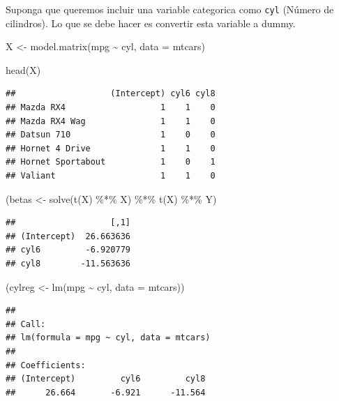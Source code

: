 \documentclass[
  12pt,
]{book}
\newenvironment{Shaded}{\begin{snugshade}}{\end{snugshade}}
\newcommand{\AttributeTok}[1]{\textcolor[rgb]{0.77,0.63,0.00}{#1}}
\newcommand{\FunctionTok}[1]{\textcolor[rgb]{0.00,0.00,0.00}{#1}}
\newcommand{\NormalTok}[1]{#1}
\newcommand{\OtherTok}[1]{\textcolor[rgb]{0.56,0.35,0.01}{#1}}
\newcommand{\SpecialCharTok}[1]{\textcolor[rgb]{0.00,0.00,0.00}{#1}}
\theoremstyle{definition}
\theoremstyle{definition}
\theoremstyle{definition}
\theoremstyle{remark}
\begin{document}
Suponga que queremos incluir una variable categorica como \texttt{cyl} (Número de cilindros). Lo que se debe hacer es convertir esta variable a dummy.

\begin{Shaded}
\begin{Highlighting}[]
\NormalTok{X }\OtherTok{\textless{}{-}} \FunctionTok{model.matrix}\NormalTok{(mpg }\SpecialCharTok{\textasciitilde{}}\NormalTok{ cyl, }\AttributeTok{data =}\NormalTok{ mtcars)}

\FunctionTok{head}\NormalTok{(X)}
\end{Highlighting}
\end{Shaded}

\begin{verbatim}
##                   (Intercept) cyl6 cyl8
## Mazda RX4                   1    1    0
## Mazda RX4 Wag               1    1    0
## Datsun 710                  1    0    0
## Hornet 4 Drive              1    1    0
## Hornet Sportabout           1    0    1
## Valiant                     1    1    0
\end{verbatim}

\begin{Shaded}
\begin{Highlighting}[]
\NormalTok{(betas }\OtherTok{\textless{}{-}} \FunctionTok{solve}\NormalTok{(}\FunctionTok{t}\NormalTok{(X) }\SpecialCharTok{\%*\%}\NormalTok{ X) }\SpecialCharTok{\%*\%} \FunctionTok{t}\NormalTok{(X) }\SpecialCharTok{\%*\%}\NormalTok{ Y)}
\end{Highlighting}
\end{Shaded}

\begin{verbatim}
##                   [,1]
## (Intercept)  26.663636
## cyl6         -6.920779
## cyl8        -11.563636
\end{verbatim}

\begin{Shaded}
\begin{Highlighting}[]
\NormalTok{(cylreg }\OtherTok{\textless{}{-}} \FunctionTok{lm}\NormalTok{(mpg }\SpecialCharTok{\textasciitilde{}}\NormalTok{ cyl, }\AttributeTok{data =}\NormalTok{ mtcars))}
\end{Highlighting}
\end{Shaded}

\begin{verbatim}
## 
## Call:
## lm(formula = mpg ~ cyl, data = mtcars)
## 
## Coefficients:
## (Intercept)         cyl6         cyl8  
##      26.664       -6.921      -11.564
\end{verbatim}
\end{document}
